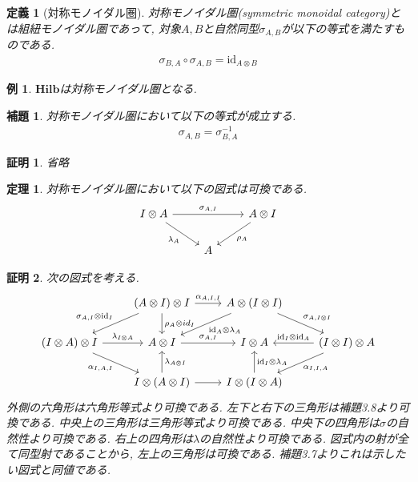 \documentclass[a4paper,12pt]{ltjsarticle}
\theoremstyle{break}
\newtheorem{defn}[thm]{定義}
\newtheorem{lem}[thm]{補題}
\newtheorem{thrm}[thm]{定理}
\newtheorem{eg}[thm]{例}
\newtheorem*{prf}{証明}
\newcommand{\rel}{\mathbf{Rel}}
\newcommand{\hilb}{\mathbf{Hilb}}
\newcommand{\xr}[1]{\xrightarrow{#1}}
\newcommand{\id}{\mathrm{id}}
\newcommand{\ci}{\circ}
\newcommand{\al}{\alpha}
\newcommand{\la}{\lambda}
\newcommand{\si}{\sigma}
\newcommand{\ot}{\otimes}
\newcommand{\ti}{\times}
\numberwithin{equation}{section}
\begin{document}

\begin{defn}[対称モノイダル圏]
  対称モノイダル圏(symmetric monoidal category)とは組紐モノイダル圏であって, 対象$A,B$と自然同型$\si_{A,B}$が以下の等式を満たすものである. 
  \begin{align*}
    \si_{B,A} \ci \si_{A,B} = \id_{A \ot B}
  \end{align*}
\end{defn}

\begin{eg}
  $\hilb$は対称モノイダル圏となる. 
\end{eg}

\begin{lem}
  対称モノイダル圏において以下の等式が成立する. 
  \begin{align*}
    \si_{A,B}=\si_{B,A}^{-1}
  \end{align*}
\end{lem} 

\begin{prf}
  省略
\end{prf}

\begin{thrm}
  対称モノイダル圏において以下の図式は可換である. 
  \[\begin{tikzcd}
    {I \ot A} && {A \ot I} \\
    & A
    \arrow["{\si_{A,I}}", from=1-1, to=1-3]
    \arrow["{\la_A}"', from=1-1, to=2-2]
    \arrow["{\rho_A}", from=1-3, to=2-2]
  \end{tikzcd}\]
\end{thrm}

\begin{prf}
  次の図式を考える. 
  \[\begin{tikzcd}
    & {(A \ot I) \ot I} & {A \ot (I \ot I)} \\
    {(I \ot A) \ot I} & {A \ot I} & {I \ot A} & {(I \ot I) \ot A} \\
    & {I \ot (A \ot I)} & {I \ot (I \ot A)}
    \arrow["{\si_{A,I} \ot \id_I}"', from=1-2, to=2-1]
    \arrow["{\rho_A \ot id_I}", from=1-2, to=2-2]
    \arrow["{\la_{I \ot A}}", from=2-1, to=2-2]
    \arrow["{\al_{I,A,I}}"', from=2-1, to=3-2]
    \arrow["{\la_{A \ot I}}"', from=3-2, to=2-2]
    \arrow["{\al_{A,I,I}}", from=1-2, to=1-3]
    \arrow["{\id_A \ot \la_A}", from=1-3, to=2-2]
    \arrow["{\si_{A,I}}", from=2-2, to=2-3]
    \arrow["{\id_I \ot \id_A}"', from=2-4, to=2-3]
    \arrow["{\al_{I,I,A}}", from=2-4, to=3-3]
    \arrow["{\id_I \ot \la_A}"', from=3-3, to=2-3]
    \arrow[from=3-2, to=3-3]
    \arrow["{\si_{A,I \ot I}}", from=1-3, to=2-4]
  \end{tikzcd}\]
  外側の六角形は六角形等式より可換である. 
  左下と右下の三角形は補題3.8より可換である. 
  中央上の三角形は三角形等式より可換である. 
  中央下の四角形は$\si$の自然性より可換である. 
  右上の四角形は$\la$の自然性より可換である. 
  図式内の射が全て同型射であることから, 左上の三角形は可換である. 
  補題3.7よりこれは示したい図式と同値である. 
\end{prf}
\end{document}
